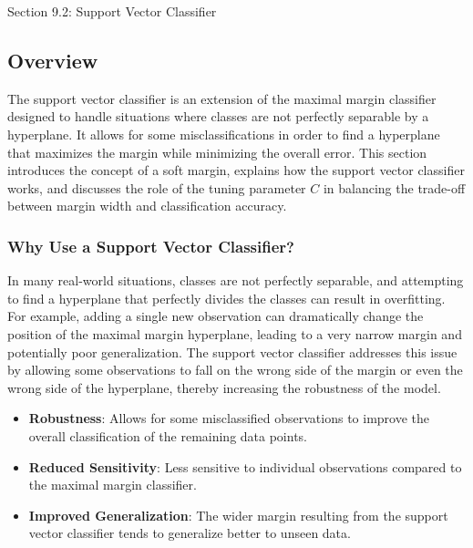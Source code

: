 \begin{notes}{Section 9.2: Support Vector Classifier}
    \subsection*{Overview}

    The support vector classifier is an extension of the maximal margin classifier designed to handle situations where classes are not perfectly separable by a hyperplane. It allows for some misclassifications 
    in order to find a hyperplane that maximizes the margin while minimizing the overall error. This section introduces the concept of a soft margin, explains how the support vector classifier works, and discusses 
    the role of the tuning parameter $C$ in balancing the trade-off between margin width and classification accuracy.
    
    \subsubsection*{Why Use a Support Vector Classifier?}
    
    In many real-world situations, classes are not perfectly separable, and attempting to find a hyperplane that perfectly divides the classes can result in overfitting. For example, adding a single new observation 
    can dramatically change the position of the maximal margin hyperplane, leading to a very narrow margin and potentially poor generalization. The support vector classifier addresses this issue by allowing some 
    observations to fall on the wrong side of the margin or even the wrong side of the hyperplane, thereby increasing the robustness of the model.
    
    \begin{highlight}
        \begin{itemize}
            \item \textbf{Robustness}: Allows for some misclassified observations to improve the overall classification of the remaining data points.
            \item \textbf{Reduced Sensitivity}: Less sensitive to individual observations compared to the maximal margin classifier.
            \item \textbf{Improved Generalization}: The wider margin resulting from the support vector classifier tends to generalize better to unseen data.
        \end{itemize}
    \end{highlight}
    

\end{notes}
